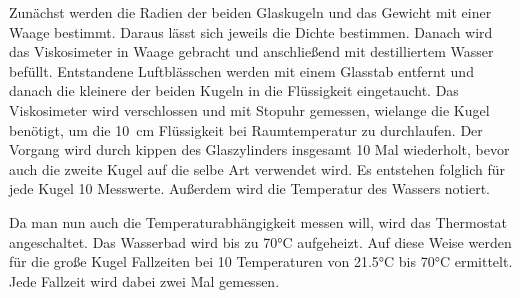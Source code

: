 Zunächst werden die Radien der beiden Glaskugeln und das Gewicht mit einer 
Waage bestimmt. Daraus lässt sich jeweils die Dichte bestimmen. 
Danach wird das Viskosimeter in Waage gebracht und anschließend mit destilliertem Wasser 
befüllt. Entstandene Luftblässchen werden mit einem Glasstab entfernt und 
danach die kleinere der beiden Kugeln in die Flüssigkeit eingetaucht. Das 
Viskosimeter wird verschlossen und mit Stopuhr gemessen, wielange die Kugel benötigt, 
um die \SI{10}{\centi\meter} Flüssigkeit bei Raumtemperatur zu durchlaufen. 
Der Vorgang wird durch kippen des Glaszylinders insgesamt 10 Mal wiederholt, 
bevor auch die zweite Kugel auf die selbe Art verwendet wird. Es entstehen 
folglich für jede Kugel 10 Messwerte. Außerdem wird die Temperatur des Wassers
notiert. 

Da man nun auch die Temperaturabhängigkeit messen will, wird das Thermostat
angeschaltet. Das Wasserbad wird bis zu 70°C aufgeheizt. 
Auf diese Weise werden für die große Kugel Fallzeiten bei 10 
Temperaturen von 21.5°C bis 70°C ermittelt.
Jede Fallzeit wird dabei zwei Mal gemessen. 


\label{sec:Durchführung}
